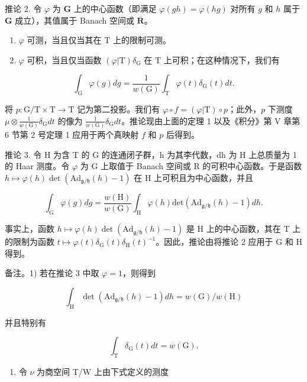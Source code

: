 推论 2. 令 \(\varphi\) 为 \(\mathbf{G}\) 上的中心函数（即满足 \(\varphi(gh) = \varphi(hg)\) 对所有 \(g\) 和 \(h\) 属于 \(\mathbf{G}\) 成立），其值属于 Banach 空间或 \(\overline{\mathbf{R}}\)。

\begin{enumerate}
\def\labelenumi{\alph{enumi})}
\item
  \(\varphi\) 可测，当且仅当其在 T 上的限制可测。
\item
  \(\varphi\) 可积，当且仅当函数 \((\varphi |\mathrm{T})\delta_{\mathrm{G}}\) 在 \(\mathrm{T}\) 上可积；在这种情况下，我们有
\end{enumerate}

\[
\int_ {\mathrm{G}} \varphi (g) d g = \frac {1}{w (\mathrm{G})} \int_ {\mathrm{T}} \varphi (t) \delta_ {\mathrm{G}} (t) d t.\tag{6}
\]

将 \(p: \mathrm{G} / \mathrm{T} \times \mathrm{T} \to \mathrm{T}\) 记为第二投影。我们有 \(\varphi \circ f = (\varphi | \mathrm{T}) \circ p\)；此外，\(p\) 下测度 \(\mu \otimes \frac{1}{w(\mathrm{G})} \delta_{\mathrm{G}} dt\) 的像为 \(\frac{1}{w(\mathrm{G})} \delta_{\mathrm{G}} dt\)。推论现由上面的定理 1 以及《积分》第 V 章第 6 节第 2 号定理 1 应用于两个真映射 \(f\) 和 \(p\) 后得到。

推论 3. 令 H 为含 T 的 G 的连通闭子群，h 为其李代数，dh 为 H 上总质量为 1 的 Haar 测度。令 \(\varphi\) 为 G 上取值于 Banach 空间或 R 的可积中心函数。于是函数 \(h \mapsto \varphi(h) \det(\mathrm{Ad}_{\mathfrak{g}/\mathfrak{h}}(h) - 1)\) 在 H 上可积且为中心函数，并且

\[
\int_ {\mathrm{G}} \varphi (g) d g = \frac {w (\mathrm{H})}{w (\mathrm{G})} \int_ {\mathrm{H}} \varphi (h) \mathrm{det} (\mathrm{Ad} _ {\mathfrak {g} / \mathfrak {h}} (h) - 1) d h.\tag{7}
\]

事实上，函数 \(h \mapsto \varphi(h) \det(\mathrm{Ad}_{\mathfrak{g}/\mathfrak{h}}(h) - 1)\) 是 H 上的中心函数，其在 T 上的限制为函数 \(t \mapsto \varphi(t) \delta_{\mathrm{G}}(t) \delta_{\mathrm{H}}(t)^{-1}\)。因此，推论由将推论 2 应用于 G 和 H 得到。

备注。1) 若在推论 3 中取 \(\varphi = 1\)，则得到

\[
\int_ {\mathrm{H}} \det (\mathrm{Ad} _ {\mathfrak {g} / \mathfrak {h}} (h) - 1) d h = w (\mathrm{G}) / w (\mathrm{H})\tag{8}
\]

并且特别有

\[
\int_ {\mathrm{T}} \delta_ {\mathrm{G}} (t) d t = w (\mathrm{G}).\tag{9}
\]

\begin{enumerate}
\def\labelenumi{\arabic{enumi})}
\setcounter{enumi}{1}
\tightlist
\item
  令 \(\nu\) 为商空间 T/W 上由下式定义的测度
\end{enumerate}

